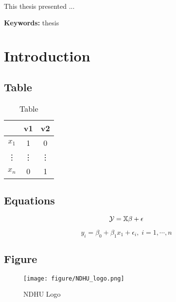 \documentclass[12pt,a4paper,oneside]{book}
\providecommand{\keywords}[1]
{
  \small  
  \textbf{Keywords: }#1
}
\begin{document}
This thesis presented ...

\mbox{}
\vfill
\keywords{thesis}%

\thispagestyle{empty}

\newpage
\setcounter{page}{1}
{
  \hypersetup{linkcolor=black}
  \tableofcontents
}

\newpage

\chapter{Introduction}
\label{ch: intro}
\section{Table}

\begin{table}[H]
\centering
\fontsize{20}{20}\selectfont%
\caption{Table}
\renewcommand{\arraystretch}{1.5}
\label{tab: tab1}
\begin{tabular}[t]{|c|c|c|}%
    \hline
    & v1 & v2 \\
    \hline
    $x_1$ & 1 & 0\\
    \hline
    \vdots & \vdots & \vdots\\
    \hline
    $x_n$ & 0 & 1\\
    \hline
\end{tabular}
\end{table}

\section{Equations}
\begin{equation}\label{equ: reg}
    \Large{\mathcal{Y} = \mathbb{X}\beta+\epsilon}
\end{equation}

\begin{equation*}\label{equ: reg}
    y_i =\beta_0+\beta_1x_1+\epsilon_i,\;i=1,\cdots,n
\end{equation*}

\section{Figure}
\begin{figure}[H]
     \centering
     \texttt{[image: figure/NDHU\_logo.png]}
     \caption{NDHU Logo}
     \label{fig: ndhulogo}
\end{figure}
\end{document}
